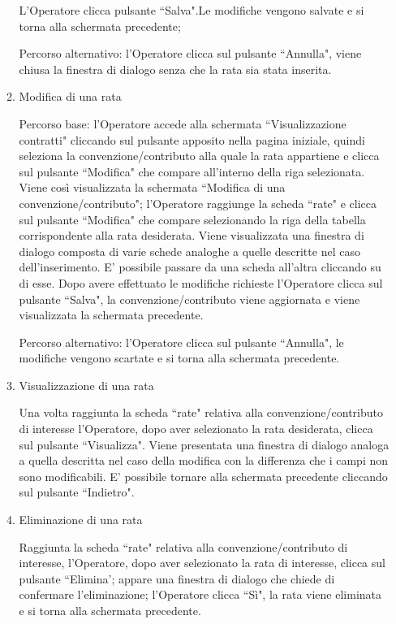 \begin{enumerate}
\begin{enumerate}
L'Operatore clicca pulsante \textquotedblleft Salva".Le modifiche vengono salvate e si torna alla schermata precedente;

Percorso alternativo:
l'Operatore clicca sul pulsante ``Annulla", viene chiusa la finestra di dialogo senza che la rata sia stata inserita.

\item Modifica di una rata\\ \label{UC_edit_installment}

Percorso base:
l'Operatore accede alla schermata ``Visualizzazione contratti" cliccando sul pulsante apposito nella pagina iniziale, quindi seleziona la convenzione/contributo alla quale la rata appartiene e clicca sul pulsante ``Modifica" che compare
all'interno della riga selezionata. Viene così visualizzata la schermata ``Modifica di una convenzione/contributo"; l'Operatore raggiunge la scheda ``rate" e clicca sul pulsante ``Modifica" che compare selezionando la riga della tabella
corrispondente alla rata desiderata. Viene visualizzata una finestra di dialogo composta di varie schede analoghe a quelle descritte nel caso dell'inserimento. E' possibile passare da una scheda all'altra cliccando su di esse.
Dopo avere effettuato le modifiche richieste l'Operatore clicca sul pulsante ``Salva", la convenzione/contributo viene aggiornata e viene visualizzata la schermata precedente.

Percorso alternativo:
l'Operatore clicca sul pulsante ``Annulla", le modifiche vengono scartate e si torna alla schermata precedente.

\item Visualizzazione di una rata \label{UC_view_installment}

Una volta raggiunta la scheda ``rate" relativa alla convenzione/contributo di interesse l'Operatore, dopo aver selezionato la rata desiderata, clicca sul pulsante ``Visualizza". Viene presentata una finestra di dialogo analoga a quella descritta nel caso della modifica 
con la differenza che i campi non sono modificabili. E' possibile tornare alla schermata precedente cliccando sul pulsante ``Indietro".

\item Eliminazione di una rata\\ \label{UC_delete_installment}

Raggiunta la scheda ``rate" relativa alla convenzione/contributo di interesse, l'Operatore, dopo aver selezionato la rata di interesse, clicca sul pulsante ``Elimina'; appare una finestra di dialogo che chiede di confermare
l'eliminazione; l'Operatore clicca \textquotedblleft Sì", la rata viene eliminata e si torna alla schermata precedente.


\end{enumerate}
\end{enumerate}

